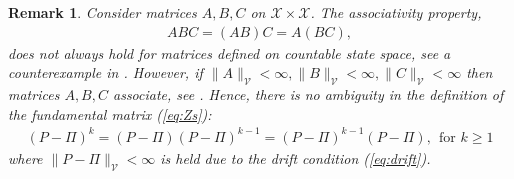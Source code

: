 \documentclass[11pt]{article}
\newcommand{\R}{\mathbb{R}}
\newcommand{\X}{\mathcal{X}}
\newcommand{\V}{\mathcal{V}}
\newtheorem{remark}{Remark}
\theoremstyle{definition}
\numberwithin{equation}{section}
\begin{document}
 \begin{remark}
  Consider matrices $A, B,C$ on $\X\times \X$.
The   associativity property,
\begin{align*}
 ABC =(AB)C= A(BC),
 \end{align*}
does not always hold for matrices defined on countable state space, see a counterexample  in \cite[Section 1.1]{Kemeny1976}. However, if  $\|A\|_\V<\infty, \|B\|_\V<\infty, \|C\|_\V<\infty$ then matrices $A, B, C$ associate, see \cite[Lemma 2.1]{Jiang2017}.
Hence,  there is no ambiguity in the definition of the fundamental matrix (\ref{eq:Zs}):
\begin{align*}
\left( P-\Pi \right)^k =\left( P-\Pi \right) \left( P-\Pi \right)^{k-1}=\left( P-\Pi \right)^{k-1}\left( P-\Pi \right),~~\text{for }k\geq 1
 \end{align*}
where $\|P-\Pi\|_\V<\infty$ is held due to the drift condition (\ref{eq:drift}).
\end{remark}











%
%

%
%
\end{document}
